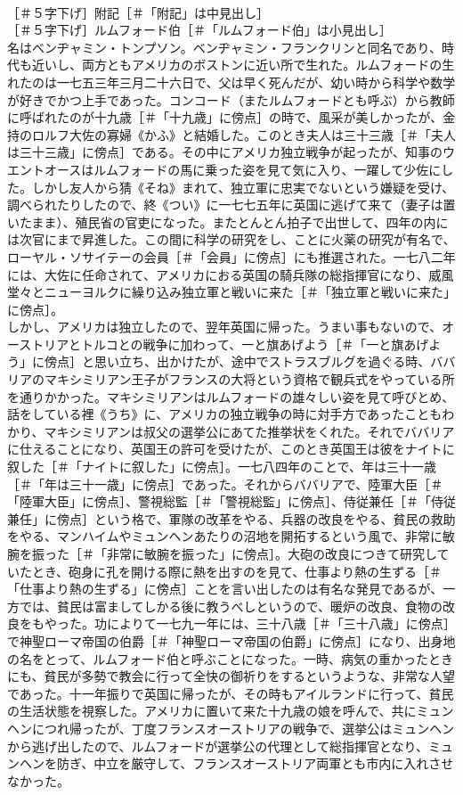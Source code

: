 \documentclass[8pt]{extreport}
\begin{document}
\begin{CJK}{UTF8}{min}
\\	［＃５字下げ］附記［＃「附記」は中見出し］
\\	［＃５字下げ］ルムフォード伯［＃「ルムフォード伯」は小見出し］
\\	名はベンヂャミン・トンプソン。ベンヂャミン・フランクリンと同名であり、時代も近いし、両方ともアメリカのボストンに近い所で生れた。ルムフォードの生れたのは一七五三年三月二十六日で、父は早く死んだが、幼い時から科学や数学が好きでかつ上手であった。コンコード（またルムフォードとも呼ぶ）から教師に呼ばれたのが十九歳［＃「十九歳」に傍点］の時で、風采が美しかったが、金持のロルフ大佐の寡婦《かふ》と結婚した。このとき夫人は三十三歳［＃「夫人は三十三歳」に傍点］である。その中にアメリカ独立戦争が起ったが、知事のウエントオースはルムフォードの馬に乗った姿を見て気に入り、一躍して少佐にした。しかし友人から猜《そね》まれて、独立軍に忠実でないという嫌疑を受け、調べられたりしたので、終《つい》に一七七五年に英国に逃げて来て（妻子は置いたまま）、殖民省の官吏になった。またとんとん拍子で出世して、四年の内には次官にまで昇進した。この間に科学の研究をし、ことに火薬の研究が有名で、ローヤル・ソサイテーの会員［＃「会員」に傍点］にも推選された。一七八二年には、大佐に任命されて、アメリカにおる英国の騎兵隊の総指揮官になり、威風堂々とニューヨルクに繰り込み独立軍と戦いに来た［＃「独立軍と戦いに来た」に傍点］。
\\	しかし、アメリカは独立したので、翌年英国に帰った。うまい事もないので、オーストリアとトルコとの戦争に加わって、一と旗あげよう［＃「一と旗あげよう」に傍点］と思い立ち、出かけたが、途中でストラスブルグを過ぐる時、ババリアのマキシミリアン王子がフランスの大将という資格で観兵式をやっている所を通りかかった。マキシミリアンはルムフォードの雄々しい姿を見て呼びとめ、話をしている裡《うち》に、アメリカの独立戦争の時に対手方であったこともわかり、マキシミリアンは叔父の選挙公にあてた推挙状をくれた。それでババリアに仕えることになり、英国王の許可を受けたが、このとき英国王は彼をナイトに叙した［＃「ナイトに叙した」に傍点］。一七八四年のことで、年は三十一歳［＃「年は三十一歳」に傍点］であった。それからババリアで、陸軍大臣［＃「陸軍大臣」に傍点］、警視総監［＃「警視総監」に傍点］、侍従兼任［＃「侍従兼任」に傍点］という格で、軍隊の改革をやる、兵器の改良をやる、貧民の救助をやる、マンハイムやミュンヘンあたりの沼地を開拓するという風で、非常に敏腕を振った［＃「非常に敏腕を振った」に傍点］。大砲の改良につきて研究していたとき、砲身に孔を開ける際に熱を出すのを見て、仕事より熱の生ずる［＃「仕事より熱の生ずる」に傍点］ことを言い出したのは有名な発見であるが、一方では、貧民は富ましてしかる後に教うべしというので、暖炉の改良、食物の改良をもやった。功によりて一七九一年には、三十八歳［＃「三十八歳」に傍点］で神聖ローマ帝国の伯爵［＃「神聖ローマ帝国の伯爵」に傍点］になり、出身地の名をとって、ルムフォード伯と呼ぶことになった。一時、病気の重かったときにも、貧民が多勢で教会に行って全快の御祈りをするというような、非常な人望であった。十一年振りで英国に帰ったが、その時もアイルランドに行って、貧民の生活状態を視察した。アメリカに置いて来た十九歳の娘を呼んで、共にミュンヘンにつれ帰ったが、丁度フランスオーストリアの戦争で、選挙公はミュンヘンから逃げ出したので、ルムフォードが選挙公の代理として総指揮官となり、ミュンヘンを防ぎ、中立を厳守して、フランスオーストリア両軍とも市内に入れさせなかった。

\end{CJK}
\end{document}
